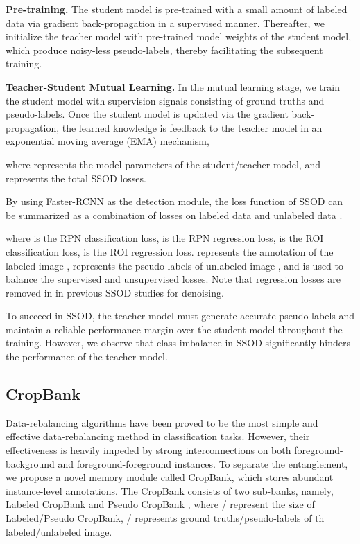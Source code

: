     \textbf{Pre-training.} 
   The student model is pre-trained with a small amount of labeled data  via gradient back-propagation in a supervised manner. Thereafter, we initialize the teacher model with pre-trained model weights of the student model, which produce noisy-less pseudo-labels, thereby facilitating the subsequent training. 
    
    \textbf{Teacher-Student Mutual Learning. } 
    In the mutual learning stage, we train the student model with supervision signals consisting of ground truths and pseudo-labels. Once the student model is updated via the gradient back-propagation, the learned knowledge is feedback to the teacher model in an exponential moving average (EMA) mechanism,
        
        
    where  represents the model parameters of the student/teacher model, and  represents the total SSOD losses.
    
    By using Faster-RCNN\cite{2017Faster} as the detection module, the loss function of SSOD can be summarized as a combination of losses on labeled data  and unlabeled data .
        
    
    
where  is the RPN classification loss, is the RPN regression loss,  is the ROI classification loss,  is the ROI regression loss.  represents the annotation of the labeled image ,  represents the pseudo-labels of unlabeled image , and  is used to balance the supervised and unsupervised losses. Note that regression losses are removed in  in previous SSOD studies for denoising.

To succeed in SSOD, the teacher model must generate accurate pseudo-labels and maintain a reliable performance margin over the student model throughout the training. However, we observe that class imbalance in SSOD significantly hinders the performance of the teacher model.

\subsection{CropBank}\label{3.3}

Data-rebalancing algorithms have been proved to be the most simple and effective data-rebalancing method in classification tasks. However, their effectiveness is heavily impeded by strong interconnections on both foreground-background and foreground-foreground instances. To separate the entanglement, we propose a novel memory module called CropBank, which stores abundant instance-level annotations. The CropBank consists of two sub-banks, namely, Labeled CropBank  and Pseudo CropBank , where / represent the size of Labeled/Pseudo CropBank, /  represents ground truths/pseudo-labels of th labeled/unlabeled image.

